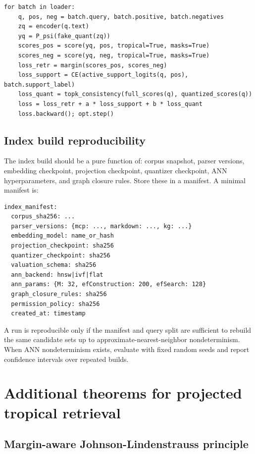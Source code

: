 \documentclass[11pt]{article}
\theoremstyle{definition}
\theoremstyle{remark}
\begin{document}
\begin{Verbatim}[fontsize=\small,frame=single]
for batch in loader:
    q, pos, neg = batch.query, batch.positive, batch.negatives
    zq = encoder(q.text)
    yq = P_psi(fake_quant(zq))
    scores_pos = score(yq, pos, tropical=True, masks=True)
    scores_neg = score(yq, neg, tropical=True, masks=True)
    loss_retr = margin(scores_pos, scores_neg)
    loss_support = CE(active_support_logits(q, pos), batch.support_label)
    loss_quant = topk_consistency(full_scores(q), quantized_scores(q))
    loss = loss_retr + a * loss_support + b * loss_quant
    loss.backward(); opt.step()
\end{Verbatim}

\subsection{Index build reproducibility}

The index build should be a pure function of: corpus snapshot, parser versions, embedding checkpoint, projection checkpoint, quantizer checkpoint, ANN hyperparameters, and graph closure rules. Store these in a manifest. A minimal manifest is:

\begin{Verbatim}[fontsize=\small,frame=single]
index_manifest:
  corpus_sha256: ...
  parser_versions: {mcp: ..., markdown: ..., kg: ...}
  embedding_model: name_or_hash
  projection_checkpoint: sha256
  quantizer_checkpoint: sha256
  valuation_schema: sha256
  ann_backend: hnsw|ivf|flat
  ann_params: {M: 32, efConstruction: 200, efSearch: 128}
  graph_closure_rules: sha256
  permission_policy: sha256
  created_at: timestamp
\end{Verbatim}

A run is reproducible only if the manifest and query split are sufficient to rebuild the same candidate sets up to approximate-nearest-neighbor nondeterminism. When ANN nondeterminism exists, evaluate with fixed random seeds and report confidence intervals over repeated builds.

\section{Additional theorems for projected tropical retrieval}

\subsection{Margin-aware Johnson-Lindenstrauss principle}
\end{document}
